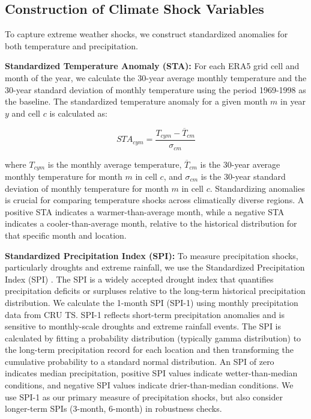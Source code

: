 \documentclass[12pt]{article}
\begin{document}
\subsection{Construction of Climate Shock Variables}

To capture extreme weather shocks, we construct standardized anomalies for both temperature and precipitation.

\textbf{Standardized Temperature Anomaly (STA):} For each ERA5 grid cell and month of the year, we calculate the 30-year average monthly temperature and the 30-year standard deviation of monthly temperature using the period 1969-1998 as the baseline.  The standardized temperature anomaly for a given month \(m\) in year \(y\) and cell \(c\) is calculated as:

\[ STA_{cym} = \frac{T_{cym} - \overline{T}_{cm}}{\sigma_{cm}} \]

where \(T_{cym}\) is the monthly average temperature, \(\overline{T}_{cm}\) is the 30-year average monthly temperature for month \(m\) in cell \(c\), and \(\sigma_{cm}\) is the 30-year standard deviation of monthly temperature for month \(m\) in cell \(c\).  Standardizing anomalies is crucial for comparing temperature shocks across climatically diverse regions.  A positive STA indicates a warmer-than-average month, while a negative STA indicates a cooler-than-average month, relative to the historical distribution for that specific month and location.

\textbf{Standardized Precipitation Index (SPI):}  To measure precipitation shocks, particularly droughts and extreme rainfall, we use the Standardized Precipitation Index (SPI) \cite{mckee1993}.  The SPI is a widely accepted drought index that quantifies precipitation deficits or surpluses relative to the long-term historical precipitation distribution.  We calculate the 1-month SPI (SPI-1) using monthly precipitation data from CRU TS.  SPI-1 reflects short-term precipitation anomalies and is sensitive to monthly-scale droughts and extreme rainfall events.  The SPI is calculated by fitting a probability distribution (typically gamma distribution) to the long-term precipitation record for each location and then transforming the cumulative probability to a standard normal distribution.  An SPI of zero indicates median precipitation, positive SPI values indicate wetter-than-median conditions, and negative SPI values indicate drier-than-median conditions.  We use SPI-1 as our primary measure of precipitation shocks, but also consider longer-term SPIs (3-month, 6-month) in robustness checks.
\end{document}
